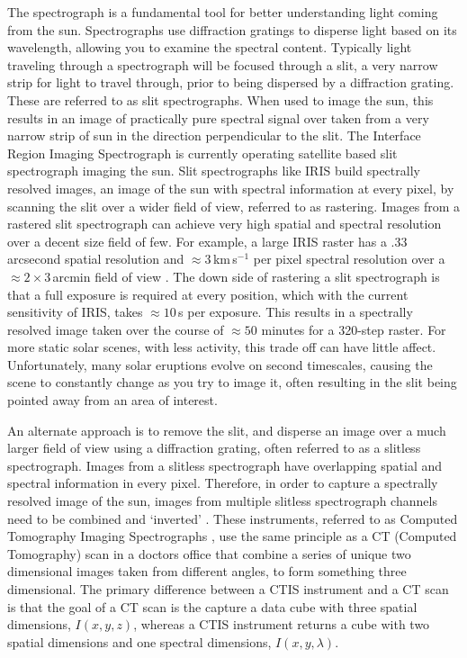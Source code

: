 The spectrograph is a fundamental tool for better understanding light coming from the sun. 
Spectrographs use diffraction gratings to disperse light based on its wavelength, allowing you to examine the spectral content.
Typically light traveling through a spectrograph will be focused through a slit, a very narrow strip for light to travel through, prior to being dispersed by a diffraction grating.
These are referred to as slit spectrographs.  
When used to image the sun, this results in an image of practically pure spectral signal over taken from a very narrow strip of sun in the direction perpendicular to the slit.
The Interface Region Imaging Spectrograph \citep[IRIS:][]{IRIS} is currently operating satellite based slit spectrograph imaging the sun.
Slit spectrographs like IRIS build spectrally resolved images, an image of the sun with spectral information at every pixel, by scanning the slit over a wider field of view, referred to as rastering.
Images from a rastered slit spectrograph can achieve very high spatial and spectral resolution over a decent size field of few.
For example, a large IRIS raster has a .33 arcsecond spatial resolution and $\approx3$\,km\,s$^{-1}$ per pixel spectral resolution over a $\approx2\times3$\,arcmin field of view \citep{DePontieu2021}.
The down side of rastering a slit spectrograph is that a full exposure is required at every position, which with the current sensitivity of IRIS, takes $\approx10$\,s per exposure.
This results in a spectrally resolved image taken over the course of $\approx50$ minutes for a 320-step raster.
For more static solar scenes, with less activity, this trade off can have little affect.
Unfortunately, many solar eruptions evolve on second timescales, causing the scene to constantly change as you try to image it, often resulting in the slit being pointed away from an area of interest.

An alternate approach is to remove the slit, and disperse an image over a much larger field of view using a diffraction grating, often referred to as a slitless spectrograph.
Images from a slitless spectrograph have overlapping spatial and spectral information in every pixel.
Therefore, in order to capture a spectrally resolved image of the sun, images from multiple slitless spectrograph channels need to be combined and `inverted' \citep[e.g.][]{KakSlaney2001}.
These instruments, referred to as Computed Tomography Imaging Spectrographs \citep[CTIS:][]{DescourDereniakCTIS1995}, use the same principle as a CT (Computed Tomography) scan in a doctors office that combine a series of unique two dimensional images taken from different angles, to form something three dimensional.
The primary difference between a CTIS instrument and a CT scan is that the goal of a CT scan is the capture a data cube with three spatial dimensions, $I(x,y,z)$, whereas a CTIS instrument returns a cube with two spatial dimensions and one spectral dimensions, $I(x,y,\lambda)$.


